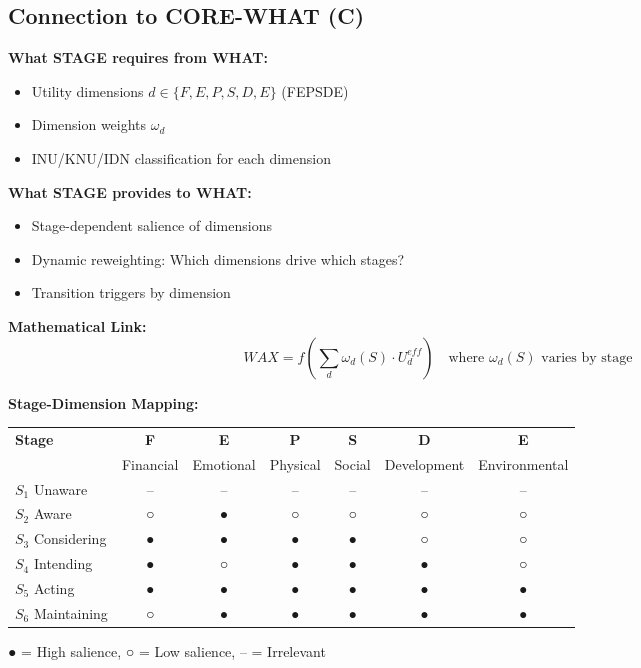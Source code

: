 \subsection{Connection to CORE-WHAT (C)}

\begin{tcolorbox}[colback=blue!5!white, colframe=blue!75!black,
    title=Integration: STAGE $\leftrightarrow$ WHAT]

\textbf{What STAGE requires from WHAT:}
\begin{itemize}[nosep]
\item Utility dimensions $d \in \{F, E, P, S, D, E\}$ (FEPSDE)
\item Dimension weights $\omega_d$
\item INU/KNU/IDN classification for each dimension
\end{itemize}

\textbf{What STAGE provides to WHAT:}
\begin{itemize}[nosep]
\item Stage-dependent salience of dimensions
\item Dynamic reweighting: Which dimensions drive which stages?
\item Transition triggers by dimension
\end{itemize}

\textbf{Mathematical Link:}
\begin{equation}
WAX = f\left(\sum_d \omega_d(S) \cdot U^{eff}_d\right) \quad \text{where } \omega_d(S) \text{ varies by stage}
\end{equation}

\textbf{Stage-Dimension Mapping:}
\begin{center}
\begin{tabular}{lcccccc}
\toprule
\textbf{Stage} & \textbf{F} & \textbf{E} & \textbf{P} & \textbf{S} & \textbf{D} & \textbf{E} \\
& \footnotesize{Financial} & \footnotesize{Emotional} & \footnotesize{Physical} & \footnotesize{Social} & \footnotesize{Development} & \footnotesize{Environmental} \\
\midrule
$S_1$ Unaware & -- & -- & -- & -- & -- & -- \\
$S_2$ Aware & ○ & ● & ○ & ○ & ○ & ○ \\
$S_3$ Considering & ● & ● & ● & ● & ○ & ○ \\
$S_4$ Intending & ● & ○ & ● & ● & ● & ○ \\
$S_5$ Acting & ● & ● & ● & ● & ● & ● \\
$S_6$ Maintaining & ○ & ● & ● & ● & ● & ● \\
\bottomrule
\end{tabular}
\end{center}
{\footnotesize ● = High salience, ○ = Low salience, -- = Irrelevant}
\end{tcolorbox}

